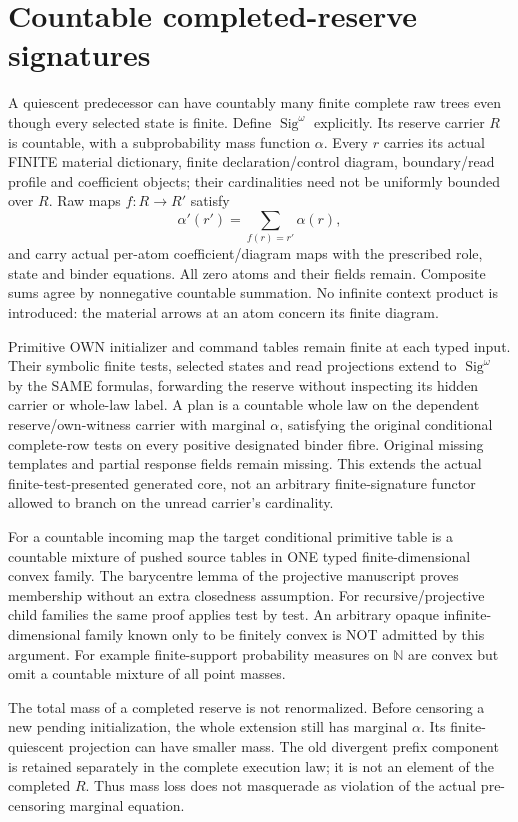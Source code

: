 \documentclass[11pt]{article}
\begin{document}
\section{Countable completed-reserve signatures}
A quiescent predecessor can have countably many finite complete raw trees even though every selected state is finite. Define $\operatorname{Sig}^{\omega}$ explicitly. Its reserve carrier $R$ is countable, with a subprobability mass function $\alpha$. Every $r$ carries its actual FINITE material dictionary, finite declaration/control diagram, boundary/read profile and coefficient objects; their cardinalities need not be uniformly bounded over $R$. Raw maps $f:R\to R'$ satisfy
\[
       \alpha'(r')=\sum_{f(r)=r'}\alpha(r),
\]
and carry actual per-atom coefficient/diagram maps with the prescribed role, state and binder equations. All zero atoms and their fields remain. Composite sums agree by nonnegative countable summation. No infinite context product is introduced: the material arrows at an atom concern its finite diagram.

Primitive OWN initializer and command tables remain finite at each typed input. Their symbolic finite tests, selected states and read projections extend to $\operatorname{Sig}^{\omega}$ by the SAME formulas, forwarding the reserve without inspecting its hidden carrier or whole-law label. A plan is a countable whole law on the dependent reserve/own-witness carrier with marginal $\alpha$, satisfying the original conditional complete-row tests on every positive designated binder fibre. Original missing templates and partial response fields remain missing. This extends the actual finite-test-presented generated core, not an arbitrary finite-signature functor allowed to branch on the unread carrier's cardinality.

For a countable incoming map the target conditional primitive table is a countable mixture of pushed source tables in ONE typed finite-dimensional convex family. The barycentre lemma of the projective manuscript proves membership without an extra closedness assumption. For recursive/projective child families the same proof applies test by test. An arbitrary opaque infinite-dimensional family known only to be finitely convex is NOT admitted by this argument. For example finite-support probability measures on $\mathbb N$ are convex but omit a countable mixture of all point masses.

The total mass of a completed reserve is not renormalized. Before censoring a new pending initialization, the whole extension still has marginal $\alpha$. Its finite-quiescent projection can have smaller mass. The old divergent prefix component is retained separately in the complete execution law; it is not an element of the completed $R$. Thus mass loss does not masquerade as violation of the actual pre-censoring marginal equation.
\end{document}
